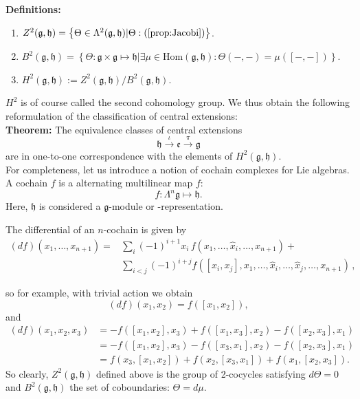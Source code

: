 \documentclass[submission, PhysLectNotes]{SciPost}
\begin{document}
{\bf Definitions:}
\begin{enumerate}
	\item $Z^2(\mathfrak{g},\mathfrak{h}) = \left\{\Theta\in\Lambda^2(\mathfrak{g},\mathfrak{h})|\Theta:(\ref{prop:Jacobi})\right\}$.
	\item $B^2(\mathfrak{g},\mathfrak{h})=\left\{\Theta:\mathfrak{g}\times\mathfrak{g}\mapsto\mathfrak{h}|\exists\mu\in\text{Hom}(\mathfrak{g},\mathfrak{h}):\Theta(-,-)=\mu([-,-])\right\}$.
	\item $H^2(\mathfrak{g},\mathfrak{h}):=Z^2(\mathfrak{g},\mathfrak{h})/B^2(\mathfrak{g},\mathfrak{h})$.
\end{enumerate}
$H^2$ is of course called the second cohomology group. We thus obtain the following reformulation of the classification of central extensions:\\

{\bf Theorem:} The equivalence classes of central extensions
\begin{equation}
	\mathfrak{h}\overset{\iota}{\rightarrow}\mathfrak{e}\overset{\pi}{\rightarrow}\mathfrak{g}
\end{equation}
are in one-to-one correspondence with the elements of $H^2(\mathfrak{g},\mathfrak{h})$.\\

For completeness, let us introduce a notion of cochain complexes for Lie algebras. A cochain $f$ is a alternating multilinear map $f$:
\begin{equation}
	f:\Lambda^n \mathfrak{g} \mapsto \mathfrak{h}.
\end{equation}
Here, $\mathfrak{h}$ is considered a $\mathfrak{g}$-module or -representation.

The differential of an $n$-cochain is given by
\begin{equation}
\begin{aligned}
	(d f)\left(x_1, \ldots, x_{n+1}\right) =
	&\sum_i     (-1)^{i+1}x_i\, f\left(x_1, \ldots, \hat x_i, \ldots, x_{n+1}\right) + \\
	&\sum_{i<j} (-1)^{i+j}      f\left(\left[x_i, x_j\right], x_1, \ldots, \hat x_i, \ldots, \hat x_j, \ldots, x_{n+1}\right)\, ,
\end{aligned}
\end{equation}

so for example, with trivial action we obtain
\begin{equation}
	(df)(x_1,x_2) = f([x_1,x_2]),
\end{equation}
and
\begin{equation}
\begin{aligned}
	(df)(x_1,x_2,x_3) &= -f([x_1,x_2],x_3) + f([x_1,x_3],x_2) - f([x_2,x_3],x_1)\\
	&= -f([x_1,x_2],x_3) - f([x_3,x_1],x_2) - f([x_2,x_3],x_1)\\
	&= f(x_3,[x_1,x_2]) + f(x_2,[x_3,x_1]) + f(x_1,[x_2,x_3]).
\end{aligned}
\end{equation}
So clearly, $Z^2(\mathfrak{g},\mathfrak{h})$ defined above is the group of 2-cocycles satisfying $d\Theta=0$ and $B^2(\mathfrak{g},\mathfrak{h})$ the set of coboundaries: $\Theta = d\mu$.


\nolinenumbers
\end{document}

